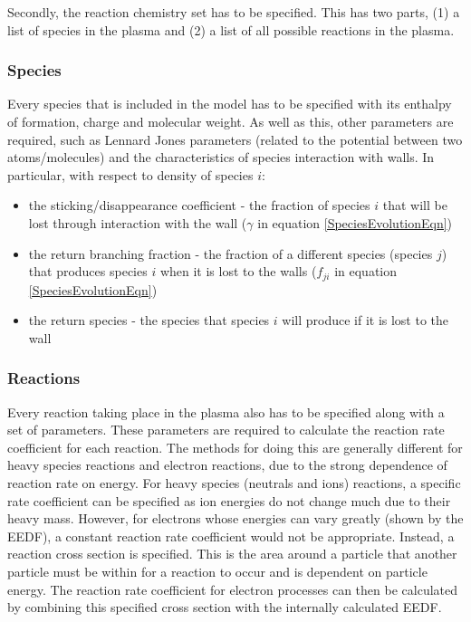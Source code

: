 \documentclass[11pt, oneside]{article}   	%
\begin{document}
Secondly, the reaction chemistry set has to be specified. 
This has two parts, (1) a list of species in the plasma and (2) a list of all possible reactions in the plasma.


\subsubsection*{Species}
Every species that is included in the model has to be specified with its enthalpy of formation, charge and molecular weight.
As well as this, other parameters are required, such as Lennard Jones parameters (related to the potential between two atoms/molecules) and the characteristics of species interaction with walls.
In particular, with respect to density of species $i$:
\begin{itemize}
\item the sticking/disappearance coefficient - the fraction of species $i$ that will be lost through interaction with the wall ($\gamma$ in equation \ref{SpeciesEvolutionEqn})
\item the return branching fraction - the fraction of a different species (species $j$) that produces species $i$ when it is lost to the walls ($f_{ji}$ in equation \ref{SpeciesEvolutionEqn})
\item the return species - the species that species $i$ will produce if it is lost to the wall
\end{itemize}



\subsubsection*{Reactions}
\label{Reactions}
Every reaction taking place in the plasma also has to be specified along with a set of parameters.
These parameters are required to calculate the reaction rate coefficient for each reaction.
The methods for doing this are generally different for heavy species reactions and electron reactions, due to the strong dependence of reaction rate on energy.
For heavy species (neutrals and ions) reactions, a specific rate coefficient can be specified as ion energies do not change much due to their heavy mass.
However, for electrons whose energies can vary greatly (shown by the EEDF), a constant reaction rate coefficient would not be appropriate.
Instead, a reaction cross section is specified.
This is the area around a particle that another particle must be within for a reaction to occur and is dependent on particle energy.
The reaction rate coefficient for electron processes can then be calculated by combining this specified cross section with the internally calculated EEDF.
\end{document}
